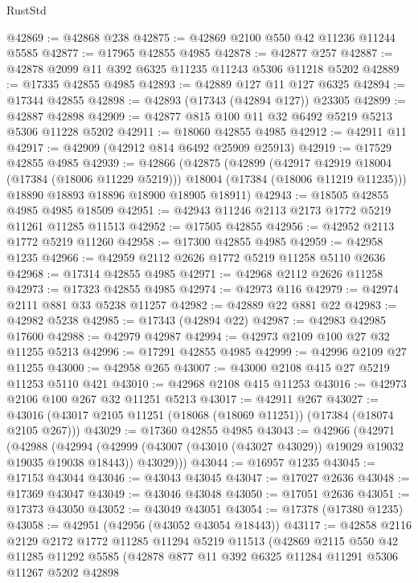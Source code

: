 \begin{lexlean}{RustStd}
\begin{coremodule}
@42869 := @42868 @238
@42875 := @42869 @2100 @550 @42 @11236 @11244 @5585
@42877 := @17965 @42855 @4985
@42878 := @42877 @257
@42887 := @42878 @2099 @11 @392 @6325 @11235 @11243 @5306 @11218 @5202
@42889 := @17335 @42855 @4985
@42893 := @42889 @127 @11 @127 @6325
@42894 := @17344 @42855
@42898 := @42893 (@17343 (@42894 @127)) @23305
@42899 := @42887 @42898
@42909 := @42877 @815 @100 @11 @32 @6492 @5219 @5213 @5306 @11228 @5202
@42911 := @18060 @42855 @4985
@42912 := @42911 @11
@42917 := @42909 (@42912 @814 @6492 @25909 @25913)
@42919 := @17529 @42855 @4985
@42939 := @42866
    (@42875
      (@42899
        (@42917 @42919 @18004 (@17384 (@18006 @11229 @5219)))
        @18004
        (@17384 (@18006 @11219 @11235)))
      @18890
      @18893
      @18896
      @18900
      @18905
      @18911)
@42943 := @18505 @42855 @4985 @4985 @18509
@42951 := @42943 @11246 @2113 @2173 @1772 @5219 @11261 @11285 @11513
@42952 := @17505 @42855
@42956 := @42952 @2113 @1772 @5219 @11260
@42958 := @17300 @42855 @4985
@42959 := @42958 @1235
@42966 := @42959 @2112 @2626 @1772 @5219 @11258 @5110 @2636
@42968 := @17314 @42855 @4985
@42971 := @42968 @2112 @2626 @11258
@42973 := @17323 @42855 @4985
@42974 := @42973 @116
@42979 := @42974 @2111 @881 @33 @5238 @11257
@42982 := @42889 @22 @881 @22
@42983 := @42982 @5238
@42985 := @17343 (@42894 @22)
@42987 := @42983 @42985 @17600
@42988 := @42979 @42987
@42994 := @42973 @2109 @100 @27 @32 @11255 @5213
@42996 := @17291 @42855 @4985
@42999 := @42996 @2109 @27 @11255
@43000 := @42958 @265
@43007 := @43000 @2108 @415 @27 @5219 @11253 @5110 @421
@43010 := @42968 @2108 @415 @11253
@43016 := @42973 @2106 @100 @267 @32 @11251 @5213
@43017 := @42911 @267
@43027 := @43016 (@43017 @2105 @11251 (@18068 (@18069 @11251)) (@17384 (@18074 @2105 @267)))
@43029 := @17360 @42855 @4985
@43043 := @42966
    (@42971
      (@42988
        (@42994
          (@42999 (@43007 (@43010 (@43027 @43029)) @19029 @19032 @19035 @19038 @18443))
          @43029)))
@43044 := @16957 @1235
@43045 := @17153 @43044
@43046 := @43043 @43045
@43047 := @17027 @2636
@43048 := @17369 @43047
@43049 := @43046 @43048
@43050 := @17051 @2636
@43051 := @17373 @43050
@43052 := @43049 @43051
@43054 := @17378 (@17380 @1235)
@43058 := @42951 (@42956 (@43052 @43054 @18443))
@43117 := @42858
    @2116
    @2129
    @2172
    @1772
    @11285
    @11294
    @5219
    @11513
    (@42869
      @2115
      @550
      @42
      @11285
      @11292
      @5585
      (@42878
        @877
        @11
        @392
        @6325
        @11284
        @11291
        @5306
        @11267
        @5202
        @42898

\end{coremodule}
\end{lexlean}
